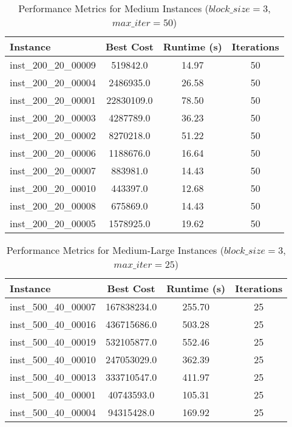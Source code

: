 \documentclass{article}
\begin{document}
\begin{table}[H]
\centering
\caption{Performance Metrics for Medium Instances ($block\_size=3$, $max\_iter=50$)}
\begin{tabular}{lccc}
\toprule
\textbf{Instance} & \textbf{Best Cost} & \textbf{Runtime (s)} & \textbf{Iterations} \\
\midrule
inst\_200\_20\_00009 & 519842.0    & 14.97 & 50 \\
inst\_200\_20\_00004 & 2486935.0   & 26.58 & 50 \\
inst\_200\_20\_00001 & 22830109.0  & 78.50 & 50 \\
inst\_200\_20\_00003 & 4287789.0   & 36.23 & 50 \\
inst\_200\_20\_00002 & 8270218.0   & 51.22 & 50 \\
inst\_200\_20\_00006 & 1188676.0   & 16.64 & 50 \\
inst\_200\_20\_00007 & 883981.0    & 14.43 & 50 \\
inst\_200\_20\_00010 & 443397.0    & 12.68 & 50 \\
inst\_200\_20\_00008 & 675869.0    & 14.43 & 50 \\
inst\_200\_20\_00005 & 1578925.0   & 19.62 & 50 \\
\bottomrule
\end{tabular}
\label{tab:performance_metrics_200_20}
\end{table}

\begin{table}[H]
\centering
\caption{Performance Metrics for Medium-Large Instances ($block\_size=3$, $max\_iter=25$)}
\begin{tabular}{lccc}
\toprule
\textbf{Instance} & \textbf{Best Cost} & \textbf{Runtime (s)} & \textbf{Iterations} \\
\midrule
inst\_500\_40\_00007 & 167838234.0  & 255.70 & 25 \\
inst\_500\_40\_00016 & 436715686.0  & 503.28 & 25 \\
inst\_500\_40\_00019 & 532105877.0  & 552.46 & 25 \\
inst\_500\_40\_00010 & 247053029.0  & 362.39 & 25 \\
inst\_500\_40\_00013 & 333710547.0  & 411.97 & 25 \\
inst\_500\_40\_00001 & 40743593.0   & 105.31 & 25 \\
inst\_500\_40\_00004 & 94315428.0   & 169.92 & 25 \\
\bottomrule
\end{tabular}
\label{tab:performance_metrics_500_40}
\end{table}
\end{document}
